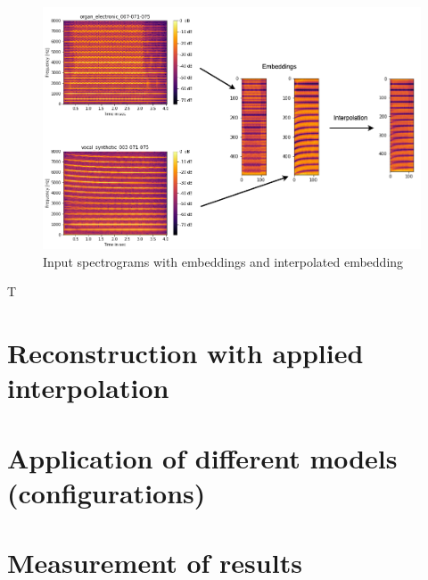  \begin{figure}[htb!]
	\caption{Input spectrograms with embeddings and interpolated embedding}
	\label{fig:exp_spec_emb_int_1D}
	\centering
	\includegraphics[width=\textwidth]{images/experiments/spec_to_emb.png}
\end{figure}

T



\section{Reconstruction with applied interpolation}

\section{Application of different models (configurations)}

\section{Measurement of results}